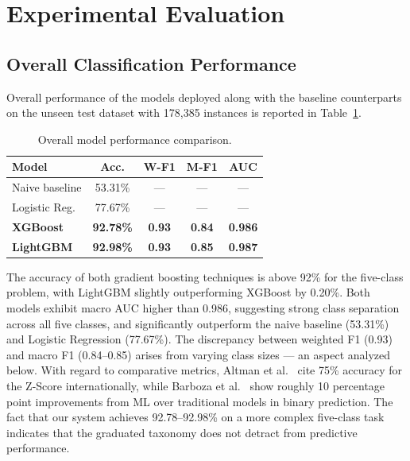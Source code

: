 \documentclass[conference]{IEEEtran}
\begin{document}
\section{Experimental Evaluation}

\subsection{Overall Classification Performance}

Overall performance of the models deployed along with the baseline counterparts on the unseen test dataset with 178,385 instances is reported in Table~\ref{tab:overall}.

\begin{table}[htbp]
\centering
\caption{Overall model performance comparison.}
\label{tab:overall}
\begin{tabular}{lcccc}
\hline
\textbf{Model} & \textbf{Acc.} & \textbf{W-F1} & \textbf{M-F1} & \textbf{AUC} \\
\hline
Naive baseline & 53.31\% & --- & --- & --- \\
Logistic Reg.  & 77.67\% & --- & --- & --- \\
\textbf{XGBoost}  & \textbf{92.78\%} & \textbf{0.93} & \textbf{0.84} & \textbf{0.986} \\
\textbf{LightGBM} & \textbf{92.98\%} & \textbf{0.93} & \textbf{0.85} & \textbf{0.987} \\
\hline
\end{tabular}
\end{table}

The accuracy of both gradient boosting techniques is above 92\% for the five-class problem, with LightGBM slightly outperforming XGBoost by 0.20\%. Both models exhibit macro AUC higher than 0.986, suggesting strong class separation across all five classes, and significantly outperform the naive baseline (53.31\%) and Logistic Regression (77.67\%). The discrepancy between weighted F1 (0.93) and macro F1 (0.84--0.85) arises from varying class sizes --- an aspect analyzed below. With regard to comparative metrics, Altman et al.~\cite{4} cite 75\% accuracy for the Z-Score internationally, while Barboza et al.~\cite{5} show roughly 10 percentage point improvements from ML over traditional models in binary prediction. The fact that our system achieves 92.78--92.98\% on a more complex five-class task indicates that the graduated taxonomy does not detract from predictive performance.
\end{document}
